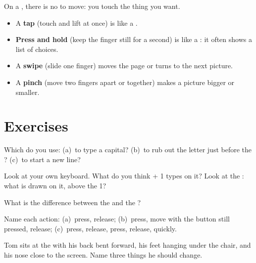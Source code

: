 On a , there is no  to move: you touch the thing you want.
\begin{itemize}
\item A \textbf{tap} (touch and lift at once) is like a .
\item \textbf{Press and hold} (keep the finger still for a second) is like a
: it often shows a list of choices.
\item A \textbf{swipe} (slide one finger) moves the page or turns to the next
picture.
\item A \textbf{pinch} (move two fingers apart or together) makes a picture
bigger or smaller.
\end{itemize}

\section{Exercises}

\begin{exercise}[$\star$]\label{exo:g2:keyboard-and-mouse:1}
Which  do you use: (a)~to type a capital? (b)~to rub out the letter just
before the ? (c)~to start a new line?
\end{exercise}

\begin{exercise}[$\star$]\label{exo:g2:keyboard-and-mouse:2}
Look at your own keyboard. What do you think  + 1 types on it? Look
at the : what is drawn on it, above the 1?
\end{exercise}

\begin{exercise}[$\star$]\label{exo:g2:keyboard-and-mouse:3}
What is the difference between the  and the ?
\end{exercise}

\begin{exercise}[$\star$]\label{exo:g2:keyboard-and-mouse:4}
Name each action: (a)~press, release; (b)~press, move with the button still
pressed, release; (c)~press, release, press, release, quickly.
\end{exercise}

\begin{exercise}[$\star$]\label{exo:g2:keyboard-and-mouse:5}
Tom sits at the  with his back bent forward, his feet hanging under the
chair, and his nose close to the screen. Name three things he should change.
\end{exercise}

